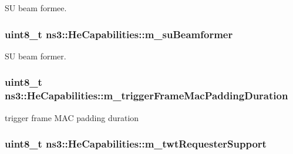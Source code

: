 SU beam formee. 

\subsubsection[{\texorpdfstring{m\+\_\+su\+Beamformer}{m_suBeamformer}}]{\setlength{\rightskip}{0pt plus 5cm}uint8\+\_\+t ns3\+::\+He\+Capabilities\+::m\+\_\+su\+Beamformer\hspace{0.3cm}{\ttfamily [private]}}\hypertarget{classns3_1_1HeCapabilities_a8a4e2966d7d67a038a7b08f7d733819c}{}\label{classns3_1_1HeCapabilities_a8a4e2966d7d67a038a7b08f7d733819c}


SU beam former. 

\subsubsection[{\texorpdfstring{m\+\_\+trigger\+Frame\+Mac\+Padding\+Duration}{m_triggerFrameMacPaddingDuration}}]{\setlength{\rightskip}{0pt plus 5cm}uint8\+\_\+t ns3\+::\+He\+Capabilities\+::m\+\_\+trigger\+Frame\+Mac\+Padding\+Duration\hspace{0.3cm}{\ttfamily [private]}}\hypertarget{classns3_1_1HeCapabilities_a26cba20100867ce3dc4eff91ca93f326}{}\label{classns3_1_1HeCapabilities_a26cba20100867ce3dc4eff91ca93f326}


trigger frame M\+AC padding duration 

\subsubsection[{\texorpdfstring{m\+\_\+twt\+Requester\+Support}{m_twtRequesterSupport}}]{\setlength{\rightskip}{0pt plus 5cm}uint8\+\_\+t ns3\+::\+He\+Capabilities\+::m\+\_\+twt\+Requester\+Support\hspace{0.3cm}{\ttfamily [private]}}\hypertarget{classns3_1_1HeCapabilities_a382c23809a167949cec43da25c8f0608}{}\label{classns3_1_1HeCapabilities_a382c23809a167949cec43da25c8f0608}


